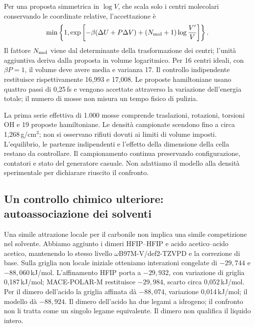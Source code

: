 \documentclass[11pt,reqno]{amsart}
\numberwithin{equation}{section}
\begin{document}
Per una proposta simmetrica in $\log V$, che scala solo i
centri molecolari conservando le coordinate relative,
l'accettazione \`e
\begin{equation}
 \min\left\{1,\exp\left[-\beta(\Delta U+P\Delta V)
 +(N_{\rm mol}+1)\log\frac{V'}{V}\right]\right\}.
\end{equation}
Il fattore $N_{\rm mol}$ viene dal determinante della
trasformazione dei centri; l'unit\`a aggiuntiva deriva dalla
proposta in volume logaritmico. Per 16 centri ideali, con
$\beta P=1$, il volume deve avere media e varianza 17.
Il controllo indipendente restituisce rispettivamente 16,993
e 17,008. Le proposte hamiltoniane usano quattro passi di
0,25\,fs e vengono accettate attraverso la variazione
dell'energia totale; il numero di mosse non misura un tempo
fisico di pulizia.

La prima serie effettiva di 1.000 mosse comprende
traslazioni, rotazioni, torsioni OH e 19 proposte hamiltoniane.
Le densit\`a campionate scendono fino a circa 1,268\,g/cm$^3$;
non si osservano rifiuti dovuti ai limiti di volume imposti.
L'equilibrio, le partenze indipendenti e l'effetto della
dimensione della cella restano da controllare. Il campionamento
continua preservando configurazione, contatori e stato del
generatore casuale. Non adattiamo il modello alla densit\`a
sperimentale per dichiarare riuscito il confronto.

\subsection{Un controllo chimico ulteriore: autoassociazione dei solventi}

Una simile attrazione locale per il carbonile non implica
una simile competizione nel solvente. Abbiamo aggiunto i
dimeri HFIP--HFIP e acido acetico--acido acetico, mantenendo
lo stesso livello $\omega$B97M-V/def2-TZVPD e la correzione
di base. Sulla griglia non locale iniziale otteniamo interazioni
congelate di $-29{,}744$ e $-88{,}060$\,kJ/mol. L'affinamento
HFIP porta a $-29{,}932$, con variazione di griglia 0,187\,kJ/mol;
MACE-POLAR-M restituisce $-29{,}984$, scarto circa 0,052\,kJ/mol.
Per il dimero dell'acido la griglia affinata d\`a $-88{,}074$,
variazione 0,014\,kJ/mol; il modello d\`a $-88{,}924$. Il dimero dell'acido
ha due legami a idrogeno; il confronto non li tratta come un
singolo legame equivalente. Il dimero non qualifica il liquido intero.
\end{document}
